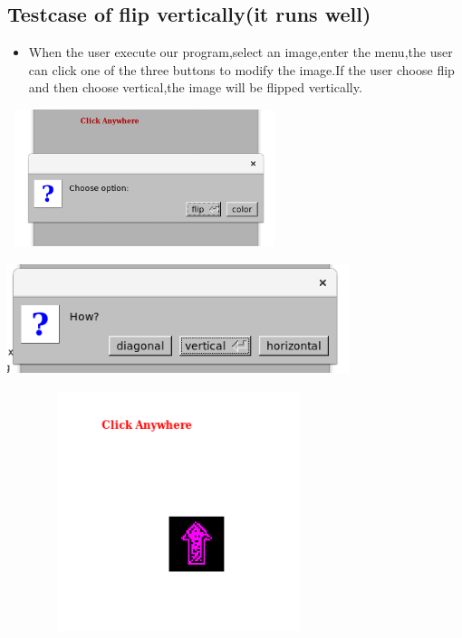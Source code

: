 \documentclass{article}
\begin{document}
\subsection*{Testcase of flip vertically(it runs well)}
\begin{itemize}
	\item When the user execute our program,select an image,enter the menu,the user can click one of the three buttons to modify the image.If the user choose flip and then choose vertical,the image will be flipped vertically.
\end{itemize}
\includegraphics[width = 8cm, height = 4cm]{4.png}
\includegraphics[width = 10cm, height = 4cm]{v1.png}
\includegraphics[width = 10cm, height = 7cm]{v2.png}
\newpage
\end{document}
